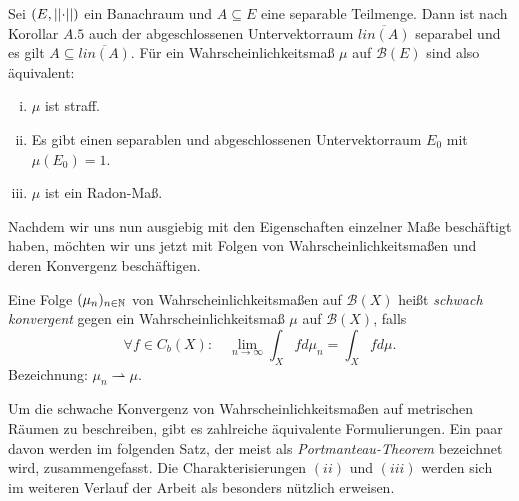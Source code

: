 \begin{remark}
    Sei $(E, \lvert\lvert \cdot \rvert\rvert)$ ein Banachraum und $A \subseteq E$ eine separable Teilmenge. Dann ist nach Korollar $A.5$ auch der abgeschlossenen Untervektorraum $\overline{lin(A)}$ separabel und es gilt $A \subseteq \overline{lin(A)}$. 
    Für ein Wahrscheinlichkeitsmaß $\mu$ auf $\mathcal{B}(E)$ sind also äquivalent: 
    \begin{enumerate}[(i)]  
        \item $\mu$ ist straff. 
        \item Es gibt einen separablen und abgeschlossenen Untervektorraum $E_0$ mit $\mu(E_0) = 1$.
        \item $\mu$ ist ein Radon-Maß. 
    \end{enumerate}
\end{remark}

Nachdem wir uns nun ausgiebig mit den Eigenschaften einzelner Maße beschäftigt haben, möchten wir uns jetzt mit Folgen von Wahrscheinlichkeitsmaßen und deren Konvergenz beschäftigen. 

\begin{mydef}
    Eine Folge $(\mu_n)_{n \in \mathbb{N}}$ von Wahrscheinlichkeitsmaßen auf $\mathcal{B}(X)$ heißt \textit{schwach konvergent} 
    gegen ein Wahrscheinlichkeitsmaß $\mu$ auf $\mathcal{B}(X)$, falls 
    $$
        \forall f \in C_b(X): \quad \lim_{n \to \infty} \int_Xfd\mu_n = \int_X fd\mu . 
    $$
    Bezeichnung: $\mu_n \rightharpoonup \mu$. 
\end{mydef}

Um die schwache Konvergenz von Wahrscheinlichkeitsmaßen auf metrischen Räumen zu beschreiben, gibt es zahlreiche äquivalente Formulierungen. 
Ein paar davon werden im folgenden Satz, der meist als \textit{Portmanteau-Theorem} bezeichnet wird, zusammengefasst. 
Die Charakterisierungen $(ii)$ und $(iii)$ werden sich im weiteren Verlauf der Arbeit als besonders nützlich erweisen. 

